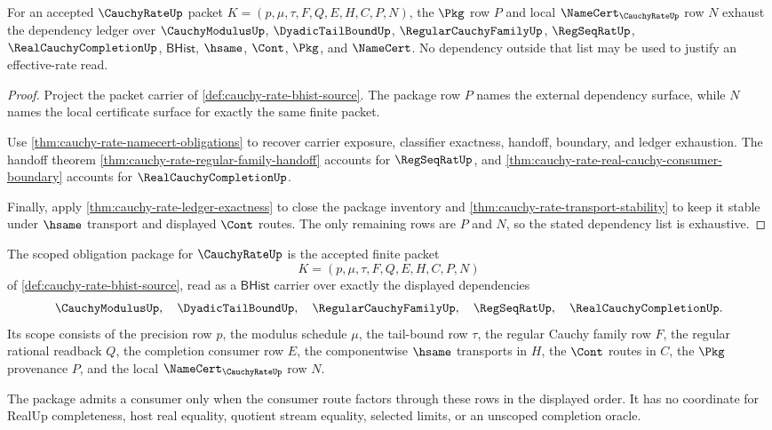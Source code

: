\begin{theorem}
\label{thm:cauchy-rate-ledger-scope}
For an accepted $\CauchyRateUp$ packet $K=(p,\mu,\tau,F,Q,E,H,C,P,N)$, the $\Pkg$ row $P$ and local $\NameCert_{\CauchyRateUp}$ row $N$ exhaust the dependency ledger over $\CauchyModulusUp$, $\DyadicTailBoundUp$, $\RegularCauchyFamilyUp$, $\RegSeqRatUp$, $\RealCauchyCompletionUp$, $\mathsf{BHist}$, $\hsame$, $\Cont$, $\Pkg$, and $\NameCert$. No dependency outside that list may be used to justify an effective-rate read.
\end{theorem}
\begin{proof}
Project the packet carrier of \autoref{def:cauchy-rate-bhist-source}. The package row $P$ names the external dependency surface, while $N$ names the local certificate surface for exactly the same finite packet.

Use \autoref{thm:cauchy-rate-namecert-obligations} to recover carrier exposure, classifier exactness, handoff, boundary, and ledger exhaustion. The handoff theorem \autoref{thm:cauchy-rate-regular-family-handoff} accounts for $\RegSeqRatUp$, and \autoref{thm:cauchy-rate-real-cauchy-consumer-boundary} accounts for $\RealCauchyCompletionUp$.

Finally, apply \autoref{thm:cauchy-rate-ledger-exactness} to close the package inventory and \autoref{thm:cauchy-rate-transport-stability} to keep it stable under $\hsame$ transport and displayed $\Cont$ routes. The only remaining rows are $P$ and $N$, so the stated dependency list is exhaustive.
\end{proof}

\begin{definition}
\label{def:cauchy-rate-scoped-obligation-package}
The scoped obligation package for $\CauchyRateUp$ is the accepted finite packet
$$
K=(p,\mu,\tau,F,Q,E,H,C,P,N)
$$
of \autoref{def:cauchy-rate-bhist-source}, read as a $\mathsf{BHist}$ carrier over exactly the displayed dependencies
$$
\CauchyModulusUp,\quad \DyadicTailBoundUp,\quad
\RegularCauchyFamilyUp,\quad \RegSeqRatUp,\quad \RealCauchyCompletionUp.
$$
Its scope consists of the precision row $p$, the modulus schedule $\mu$, the tail-bound row $\tau$, the regular Cauchy family row $F$, the regular rational readback $Q$, the completion consumer row $E$, the componentwise $\hsame$ transports in $H$, the $\Cont$ routes in $C$, the $\Pkg$ provenance $P$, and the local $\NameCert_{\CauchyRateUp}$ row $N$.

The package admits a consumer only when the consumer route factors through these rows in the displayed order. It has no coordinate for RealUp completeness, host real equality, quotient stream equality, selected limits, or an unscoped completion oracle.
\end{definition}

